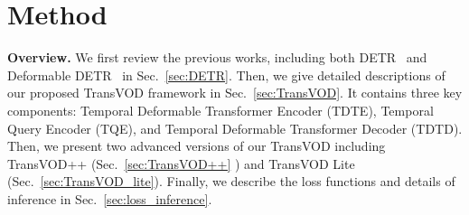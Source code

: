 \documentclass[10pt,journal,compsoc]{IEEEtran}
\begin{document}
\section{Method}
\label{sec:method}

\noindent
\textbf{Overview.} We first review the previous works, including both DETR~\cite{detr} and Deformable DETR~\cite{zhu2020deformable} in Sec.~\ref{sec:DETR}. Then, we give detailed descriptions of our proposed TransVOD framework in Sec.~\ref{sec:TransVOD}. It contains three key components: Temporal Deformable Transformer Encoder (TDTE), Temporal Query Encoder (TQE), and Temporal Deformable Transformer Decoder (TDTD). Then, we present two advanced versions of our TransVOD including TransVOD++ (Sec.~\ref{sec:TransVOD++} ) and TransVOD Lite (Sec.~\ref{sec:TransVOD_lite}). Finally, we describe the loss functions and details of inference in Sec.~\ref{sec:loss_inference}. 
\end{document}
